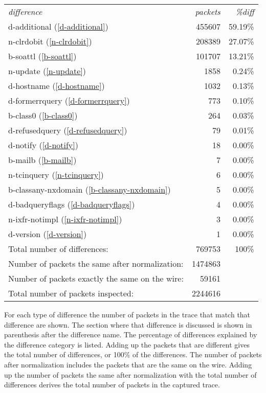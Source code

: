 \documentclass[twoside,titlepage,english]{nlnetlabs}
\begin{document}
\begin{tabular}{lrr}
{\em difference}			& {\em packets} & {\em \%diff}	\\
d-additional (\ref{d-additional}) 	&        455607 & 59.19\%	\\
n-clrdobit (\ref{n-clrdobit})		&        208389 & 27.07\%	\\
b-soattl (\ref{b-soattl})		&        101707 & 13.21\%	\\
n-update (\ref{n-update})		&          1858 & 0.24\%	\\
d-hostname (\ref{d-hostname})		&          1032 & 0.13\%	\\
d-formerrquery (\ref{d-formerrquery})	&           773 & 0.10\%	\\
b-class0 (\ref{b-class0})		&           264 & 0.03\%	\\
d-refusedquery (\ref{d-refusedquery})	&            79 & 0.01\%	\\
d-notify (\ref{d-notify})		&            18 & 0.00\%	\\
b-mailb (\ref{b-mailb})			&             7 & 0.00\%	\\
n-tcinquery (\ref{n-tcinquery})		&             6 & 0.00\%	\\
b-classany-nxdomain (\ref{b-classany-nxdomain})	&     5 & 0.00\%	\\
d-badqueryflags (\ref{d-badqueryflags})	&             4 & 0.00\%	\\
n-ixfr-notimpl (\ref{n-ixfr-notimpl})	&             3 & 0.00\%	\\
d-version (\ref{d-version})		&             1 & 0.00\%	\\
Total number of differences:            &        769753 & 100\%	\\
Number of packets the same after normalization:&1474863	\\
Number of packets exactly the same on the wire:&  59161	\\
Total number of packets inspected:             &2244616	\\
\end{tabular}

For each type of difference the number of packets in the trace that
match that difference are shown. The section where that difference
is discussed is shown in parenthesis after the difference name.
The percentage of differences
explained by the difference category is listed.  Adding up the packets
that are different gives the total number of differences, or 100\%
of the differences.
The number of packets after normalization includes the packets 
that are the same on the wire.  Adding up the number of packets the same
after normalization with the total number of differences derives 
the total number of packets in the captured trace.
\end{document}
